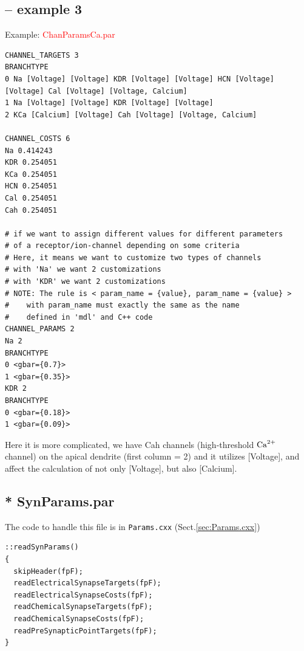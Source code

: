 \subsection{-- example 3}

Example: \textcolor{red}{ChanParamsCa.par}
\begin{verbatim}
CHANNEL_TARGETS 3
BRANCHTYPE
0 Na [Voltage] [Voltage] KDR [Voltage] [Voltage] HCN [Voltage] [Voltage] Cal [Voltage] [Voltage, Calcium]
1 Na [Voltage] [Voltage] KDR [Voltage] [Voltage]
2 KCa [Calcium] [Voltage] Cah [Voltage] [Voltage, Calcium]

CHANNEL_COSTS 6
Na 0.414243
KDR 0.254051
KCa 0.254051
HCN 0.254051
Cal 0.254051
Cah 0.254051

# if we want to assign different values for different parameters
# of a receptor/ion-channel depending on some criteria
# Here, it means we want to customize two types of channels 
# with 'Na' we want 2 customizations
# with 'KDR' we want 2 customizations
# NOTE: The rule is < param_name = {value}, param_name = {value} >
#    with param_name must exactly the same as the name
#    defined in 'mdl' and C++ code
CHANNEL_PARAMS 2   
Na 2
BRANCHTYPE
0 <gbar={0.7}>
1 <gbar={0.35}>
KDR 2
BRANCHTYPE
0 <gbar={0.18}>
1 <gbar={0.09}>
\end{verbatim}

Here it is more complicated, we have Cah channels (high-threshold ${\text{Ca}^{2+}}$
channel) on the apical dendrite (first column = 2) and it utilizes [Voltage],
and affect the calculation of not only [Voltage], but also [Calcium].


\subsection{* SynParams.par}
\label{sec:SynParams.par}

The code to handle this file is in \verb!Params.cxx! (Sect.\ref{sec:Params.cxx})
\begin{verbatim}
::readSynParams()
{
  skipHeader(fpF);
  readElectricalSynapseTargets(fpF);
  readElectricalSynapseCosts(fpF);
  readChemicalSynapseTargets(fpF);
  readChemicalSynapseCosts(fpF);
  readPreSynapticPointTargets(fpF);
}
\end{verbatim}

